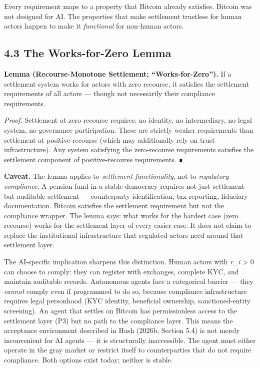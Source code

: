 \documentclass[12pt]{article}
\theoremstyle{definition}
\theoremstyle{remark}
\begin{document}
Every requirement maps to a property that Bitcoin already satisfies.
Bitcoin was not designed for AI. The properties that make settlement
trustless for human actors happen to make it \emph{functional} for
non-human actors.

\subsection{4.3 The Works-for-Zero
Lemma}\label{the-works-for-zero-lemma}

\textbf{Lemma (Recourse-Monotone Settlement; ``Works-for-Zero'').} If a
settlement system works for actors with zero recourse, it satisfies the
settlement requirements of all actors --- though not necessarily their
compliance requirements.

\emph{Proof.} Settlement at zero recourse requires: no identity, no
intermediary, no legal system, no governance participation. These are
strictly weaker requirements than settlement at positive recourse (which
may additionally rely on trust infrastructure). Any system satisfying
the zero-recourse requirements satisfies the settlement component of
positive-recourse requirements. ∎

\textbf{Caveat.} The lemma applies to \emph{settlement functionality},
not to \emph{regulatory compliance}. A pension fund in a stable
democracy requires not just settlement but auditable settlement ---
counterparty identification, tax reporting, fiduciary documentation.
Bitcoin satisfies the settlement requirement but not the compliance
wrapper. The lemma says: what works for the hardest case (zero recourse)
works for the settlement layer of every easier case. It does not claim
to replace the institutional infrastructure that regulated actors need
around that settlement layer.

The AI-specific implication sharpens this distinction. Human actors with
\emph{r\_i} \textgreater{} 0 can choose to comply: they can register
with exchanges, complete KYC, and maintain auditable records. Autonomous
agents face a categorical barrier --- they \emph{cannot} comply even if
programmed to do so, because compliance infrastructure requires legal
personhood (KYC identity, beneficial ownership, sanctioned-entity
screening). An agent that settles on Bitcoin has permissionless access
to the settlement layer (P3) but no path to the compliance layer. This
means the acceptance environment described in Hash (2026b, Section 5.4)
is not merely inconvenient for AI agents --- it is structurally
inaccessible. The agent must either operate in the gray market or
restrict itself to counterparties that do not require compliance. Both
options exist today; neither is stable.
\end{document}
